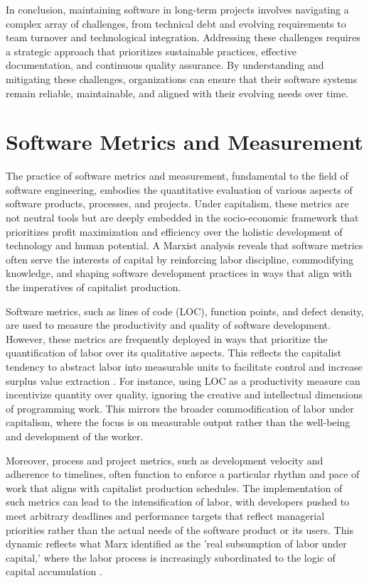 \begin{refsection}
In conclusion, maintaining software in long-term projects involves navigating a complex array of challenges, from technical debt and evolving requirements to team turnover and technological integration. Addressing these challenges requires a strategic approach that prioritizes sustainable practices, effective documentation, and continuous quality assurance. By understanding and mitigating these challenges, organizations can ensure that their software systems remain reliable, maintainable, and aligned with their evolving needs over time.

\section{Software Metrics and Measurement}

The practice of software metrics and measurement, fundamental to the field of software engineering, embodies the quantitative evaluation of various aspects of software products, processes, and projects. Under capitalism, these metrics are not neutral tools but are deeply embedded in the socio-economic framework that prioritizes profit maximization and efficiency over the holistic development of technology and human potential. A Marxist analysis reveals that software metrics often serve the interests of capital by reinforcing labor discipline, commodifying knowledge, and shaping software development practices in ways that align with the imperatives of capitalist production.

Software metrics, such as lines of code (LOC), function points, and defect density, are used to measure the productivity and quality of software development. However, these metrics are frequently deployed in ways that prioritize the quantification of labor over its qualitative aspects. This reflects the capitalist tendency to abstract labor into measurable units to facilitate control and increase surplus value extraction \cite[pp.~35-37]{Braverman1974Labor}. For instance, using LOC as a productivity measure can incentivize quantity over quality, ignoring the creative and intellectual dimensions of programming work. This mirrors the broader commodification of labor under capitalism, where the focus is on measurable output rather than the well-being and development of the worker.

Moreover, process and project metrics, such as development velocity and adherence to timelines, often function to enforce a particular rhythm and pace of work that aligns with capitalist production schedules. The implementation of such metrics can lead to the intensification of labor, with developers pushed to meet arbitrary deadlines and performance targets that reflect managerial priorities rather than the actual needs of the software product or its users. This dynamic reflects what Marx identified as the 'real subsumption of labor under capital,' where the labor process is increasingly subordinated to the logic of capital accumulation \cite[pp.~102-104]{Marx1976CapitalVol1}.


\end{refsection}
